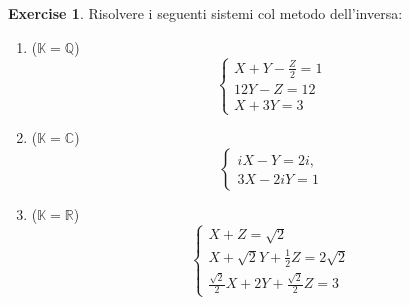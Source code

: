 \documentclass{article}
\theoremstyle{plain}
\theoremstyle{definition}
\newtheorem{xca}[exmp]{Exercise}
\theoremstyle{remark}
\begin{document}
\begin{bxthm}
\begin{xca}
    Risolvere i seguenti sistemi col metodo dell'inversa:
    \begin{enumerate}
        \item ($\mathbb{K}=\mathbb{Q}$)
        \[
          \begin{cases}
          X + Y - \frac{Z}{2} = 1 \\
          12Y - Z = 12 \\
          X + 3Y = 3
          \end{cases}
        \]
        \item ($\mathbb{K}=\mathbb{C}$)
        \[
          \begin{cases}
          iX - Y = 2i, \\
          3X - 2iY = 1
          \end{cases}
        \]
        \item ($\mathbb{K}=\mathbb{R}$)
        \[
          \begin{cases}
          X+Z=\sqrt{2}\\
          X+\sqrt{2}Y+\frac{1}{2}Z=2\sqrt{2}\\
          \frac{\sqrt{2}}{2}X+2Y+\frac{\sqrt{2}}{2}Z=3
          \end{cases}
        \]
    \end{enumerate}
\end{xca}
\end{bxthm}
\end{document}
